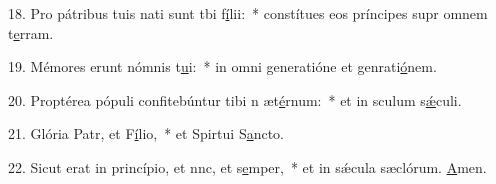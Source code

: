 18. Pro pátribus tuis nati sunt tbi f\uline{í}lii:~* constítues eos príncipes supr omnem t\uline{e}rram.\par 
19. Mémores erunt nómnis t\uline{u}i:~* in omni generatióne et genrati\uline{ó}nem.\par 
20. Proptérea pópuli confitebúntur tibi n æt\uline{é}rnum:~* et in sculum s\uline{ǽ}culi.\par 
21. Glória Patr, et F\uline{í}lio,~* et Spirtui S\uline{a}ncto.\par 
22. Sicut erat in princípio, et nnc, et s\uline{e}mper,~* et in sǽcula sæclórum. \uline{A}men.\par 
